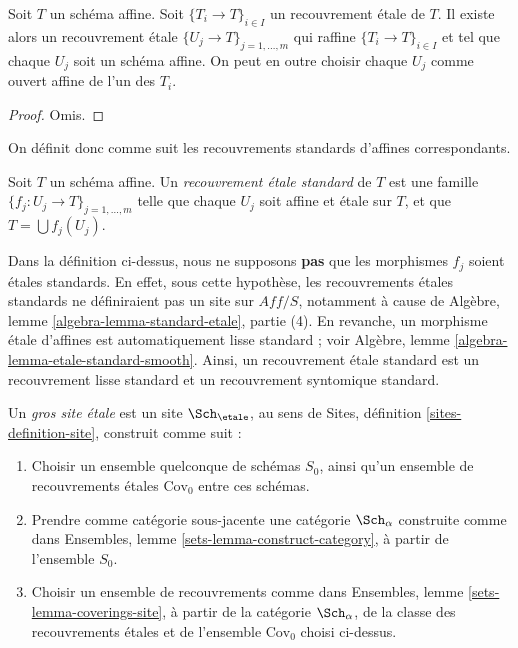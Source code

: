 \begin{lemma}
\label{lemma-etale-affine}
Soit $T$ un schéma affine.
Soit $\{T_i \to T\}_{i \in I}$ un recouvrement \'etale de $T$.
Il existe alors un recouvrement \'etale
$\{U_j \to T\}_{j = 1, \ldots, m}$ qui raffine
$\{T_i \to T\}_{i \in I}$ et tel que chaque $U_j$ soit un schéma
affine. On peut en outre choisir chaque $U_j$ comme ouvert affine
de l'un des $T_i$.
\end{lemma}

\begin{proof}
Omis.
\end{proof}

\noindent
On définit donc comme suit les recouvrements standards d'affines correspondants.

\begin{definition}
\label{definition-standard-etale}
Soit $T$ un schéma affine. Un {\it recouvrement \'etale standard}
de $T$ est une famille $\{f_j : U_j \to T\}_{j = 1, \ldots, m}$
telle que chaque $U_j$ soit affine et \'etale sur $T$, et que
$T = \bigcup f_j(U_j)$.
\end{definition}

\noindent
Dans la définition ci-dessus, nous ne supposons {\bf pas} que les morphismes $f_j$ soient
étales standards. En effet, sous cette hypothèse, les recouvrements étales
standards ne définiraient pas un site sur $\textit{Aff}/S$, notamment à cause de
Algèbre, lemme \ref{algebra-lemma-standard-etale}, partie (4).
En revanche, un morphisme étale d'affines est automatiquement
lisse standard ; voir
Algèbre, lemme \ref{algebra-lemma-etale-standard-smooth}.
Ainsi, un recouvrement étale standard est un recouvrement lisse
standard et un recouvrement syntomique standard.

\begin{definition}
\label{definition-big-etale-site}
Un {\it gros site étale} est un site $\Sch_\etale$, au sens de
Sites, définition \ref{sites-definition-site}, construit comme suit :
\begin{enumerate}
\item Choisir un ensemble quelconque de schémas $S_0$, ainsi qu'un ensemble de recouvrements étales
$\text{Cov}_0$ entre ces schémas.
\item Prendre comme catégorie sous-jacente une catégorie $\Sch_\alpha$
construite comme dans Ensembles, lemme \ref{sets-lemma-construct-category},
à partir de l'ensemble $S_0$.
\item Choisir un ensemble de recouvrements comme dans
Ensembles, lemme \ref{sets-lemma-coverings-site}, à partir de la
catégorie $\Sch_\alpha$, de la classe des recouvrements étales
et de l'ensemble $\text{Cov}_0$ choisi ci-dessus.
\end{enumerate}
\end{definition}

